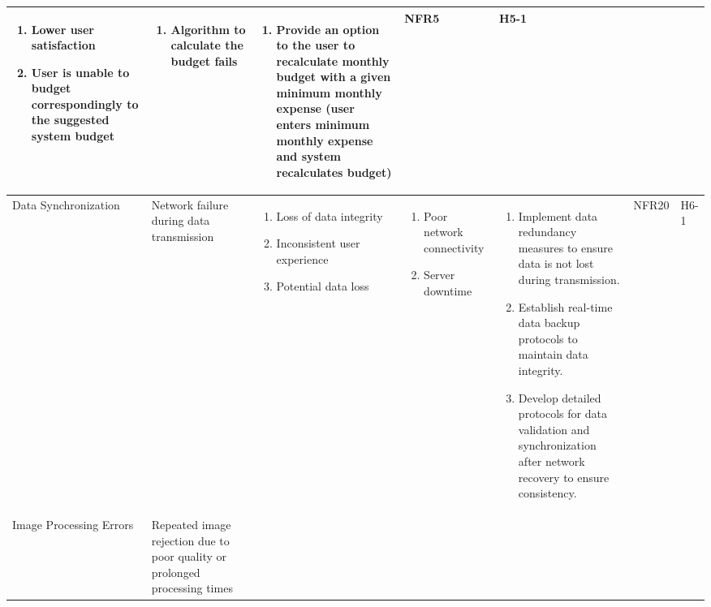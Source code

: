 \documentclass{article}
\begin{document}
\begin{landscape}
\begin{longtable}{|p{3cm}|p{4cm}|p{5cm}|p{5cm}|p{5cm}|p{1cm}|p{0.75cm}|}
    \begin{enumerate}[label=(\alph*), leftmargin=0.5cm]
        \item Lower user satisfaction
        \item User is unable to budget correspondingly to the suggested system budget 
    \end{enumerate} &
    \begin{enumerate}[label=(\alph*), leftmargin=0.5cm]
        \item Algorithm to calculate the budget fails 
    \end{enumerate} &
    \begin{enumerate}[label=(\alph*), leftmargin=0.5cm]
        \item Provide an option to the user to recalculate monthly budget with a given minimum monthly expense (user enters minimum monthly expense and system recalculates budget) 
    \end{enumerate} &
    NFR5 &
    H5-1\\
    \hline
    Data Synchronization &
    Network failure during data transmission &
    \begin{enumerate}[label=(\alph*), leftmargin=0.5cm]
        \item Loss of data integrity
        \item Inconsistent user experience
        \item Potential data loss
    \end{enumerate} &
    \begin{enumerate}[label=(\alph*), leftmargin=0.5cm]
        \item Poor network connectivity
        \item Server downtime
    \end{enumerate} &
    \begin{enumerate}[label=(\alph*), leftmargin=0.5cm]
        \item Implement data redundancy measures to ensure data is not lost during transmission.
        \item Establish real-time data backup protocols to maintain data integrity.
        \item Develop detailed protocols for data validation and synchronization after network recovery to ensure consistency.
    \end{enumerate} &
    NFR20 &
    H6-1 \\
    \hline
    Image Processing Errors &
    Repeated image rejection due to poor quality or prolonged processing times &

\end{longtable}
\end{landscape}
\end{document}
